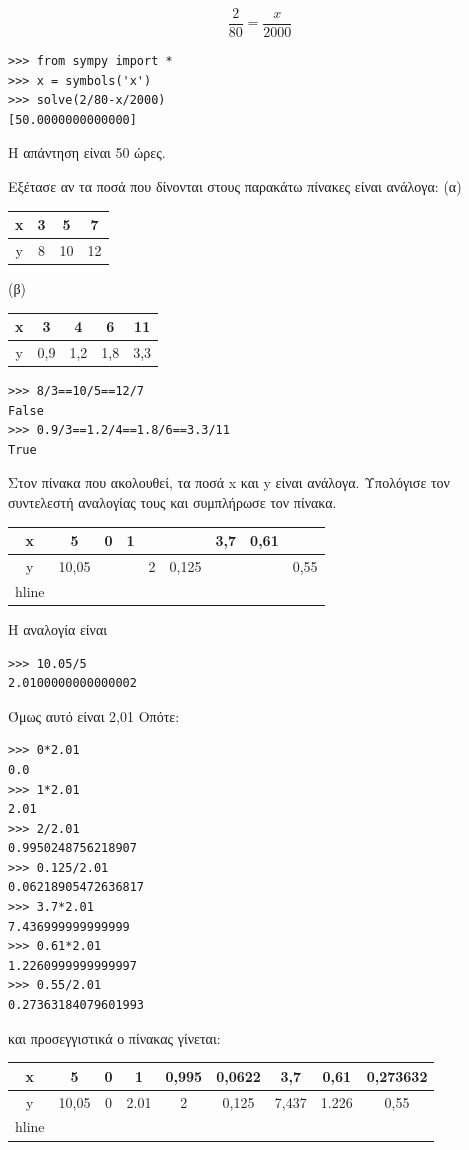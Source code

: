 $$\frac{2}{80}=\frac{x}{2000}$$
\begin{lstlisting}
>>> from sympy import *
>>> x = symbols('x')
>>> solve(2/80-x/2000)
[50.0000000000000]
\end{lstlisting}
Η απάντηση είναι 50 ώρες.
\begin{exercise}
Εξέτασε αν τα ποσά που δίνονται στους παρακάτω πίνακες είναι ανάλογα:
(α) 
\begin{table}
\begin{tabular}{|c|c|c|c|}
\hline
x&3&5 &7\\\hline
y&8&10&12\\\hline
\end{tabular}
\end{table}
(β)
\begin{table}
\begin{tabular}{|c|c|c|c|c|}
\hline
x&3&4 &6&11\\\hline
y&0,9&1,2&1,8&3,3\\\hline
\end{tabular}
\end{table}
\end{exercise}
\begin{lstlisting}
>>> 8/3==10/5==12/7
False
>>> 0.9/3==1.2/4==1.8/6==3.3/11
True
\end{lstlisting}
\begin{exercise}
Στον πίνακα που ακολουθεί, τα ποσά x και y είναι ανάλογα. Υπολόγισε τον συντελεστή
αναλογίας τους και συμπλήρωσε τον πίνακα.
\begin{table}
\begin{tabular}{|c|c|c|c|c|c|c|c|c|}
x& 5& 0& 1& & & 3,7& 0,61&\\\hline
y&10,05& & &2 &0,125&&& 0,55\\hline
\end{tabular}
\end{table}
\end{exercise}
Η αναλογία είναι 
\begin{lstlisting}
>>> 10.05/5
2.0100000000000002
\end{lstlisting}
Όμως αυτό είναι 2,01
Οπότε:
\begin{lstlisting}
>>> 0*2.01
0.0
>>> 1*2.01
2.01
>>> 2/2.01
0.9950248756218907
>>> 0.125/2.01
0.06218905472636817
>>> 3.7*2.01
7.436999999999999
>>> 0.61*2.01
1.2260999999999997
>>> 0.55/2.01
0.27363184079601993
\end{lstlisting}
και προσεγγιστικά ο πίνακας γίνεται:
\begin{table}
\begin{tabular}{|c|c|c|c|c|c|c|c|c|}
x& 5       & 0& 1      &0,995 & 0,0622 & 3,7   & 0,61&  0,273632\\\hline
y&10,05& 0 & 2.01&2         &0,125      &7,437& 1.226&0,55\\hline
\end{tabular}
\end{table}

